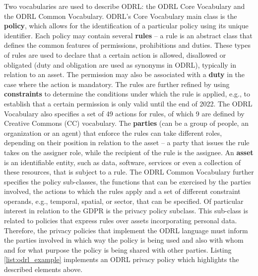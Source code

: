 Two vocabularies are used to describe ODRL: the ODRL Core Vocabulary and the ODRL Common Vocabulary.
ODRL's Core Vocabulary main class is the \textbf{policy}, which allows for the identification of a particular policy using its unique identifier.
Each policy may contain several \textbf{rules} -- a rule is an abstract class that defines the common features of permissions, prohibitions and duties.
These types of rules are used to declare that a certain action is allowed, disallowed or obligated (duty and obligation are used as synonyms in ODRL), typically in relation to an asset.
The permission may also be associated with a \textbf{duty} in the case where the action is mandatory.
The rules are further refined by using \textbf{constraints} to determine the conditions under which the rule is applied, e.g., to establish that a certain permission is only valid until the end of 2022.
The ODRL Vocabulary also specifies a set of 49 actions for rules, of which 9 are defined by Creative Commons (CC) vocabulary.
The \textbf{parties} (can be a group of people, an organization or an agent) that enforce the rules can take different roles, depending on their position in relation to the asset -- a party that issues the rule takes on the assigner role, while the recipient of the rule  is the assignee.
An \textbf{asset} is an identifiable entity, such as data, software, services or even a collection of these resources, that is subject to a rule.
The ODRL Common Vocabulary further specifies the policy sub-classes, the functions that can be exercised by the parties involved, the actions to which the rules apply and a set of different constraint operands, e.g., temporal, spatial, or sector, that can be specified.
Of particular interest in relation to the GDPR is the privacy policy subclass.
This sub-class is related to policies that express rules over assets incorporating personal data.
Therefore, the privacy policies that implement the ODRL language must inform the parties involved in which way the policy is being used and also with whom and for what purpose the policy is being shared with other parties.
Listing \ref{list:odrl_example} implements an ODRL privacy policy which highlights the described elements above.

